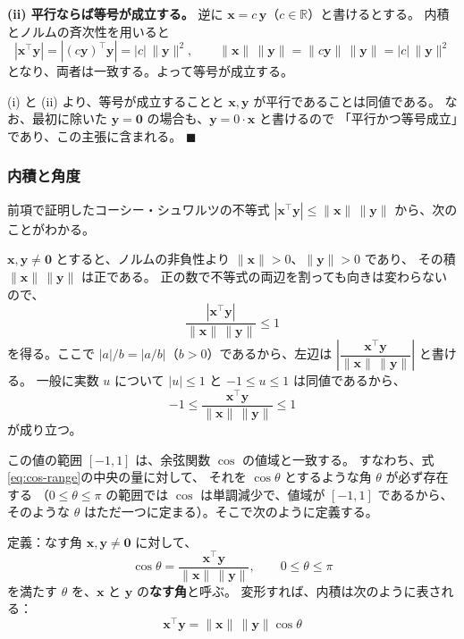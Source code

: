 \textbf{(ii) 平行ならば等号が成立する。}\quad
逆に $\bm{x} = c\,\bm{y}$（$c \in \mathbb{R}$）と書けるとする。
内積とノルムの斉次性を用いると
\begin{equation}
  |\bm{x}^\top \bm{y}| = |(c\bm{y})^\top \bm{y}| = |c| \, \|\bm{y}\|^2, \qquad
  \|\bm{x}\| \, \|\bm{y}\| = \|c\bm{y}\| \, \|\bm{y}\| = |c| \, \|\bm{y}\|^2
\end{equation}
となり、両者は一致する。よって等号が成立する。

(i) と (ii) より、等号が成立することと $\bm{x}, \bm{y}$ が平行であることは同値である。
なお、最初に除いた $\bm{y} = \bm{0}$ の場合も、$\bm{y} = 0 \cdot \bm{x}$ と書けるので
「平行かつ等号成立」であり、この主張に含まれる。
\hfill $\blacksquare$

\subsubsection{内積と角度}

前項で証明したコーシー・シュワルツの不等式
$|\bm{x}^\top \bm{y}| \leq \|\bm{x}\| \, \|\bm{y}\|$ から、次のことがわかる。

$\bm{x}, \bm{y} \neq \bm{0}$ とすると、ノルムの非負性より $\|\bm{x}\| > 0$、$\|\bm{y}\| > 0$ であり、
その積 $\|\bm{x}\| \, \|\bm{y}\|$ は正である。
正の数で不等式の両辺を割っても向きは変わらないので、
\begin{equation}
  \frac{|\bm{x}^\top \bm{y}|}{\|\bm{x}\| \, \|\bm{y}\|} \leq 1
\end{equation}
を得る。ここで $|a|/b = |a/b|$（$b > 0$）であるから、左辺は
$\left| \dfrac{\bm{x}^\top \bm{y}}{\|\bm{x}\| \, \|\bm{y}\|} \right|$ と書ける。
一般に実数 $u$ について $|u| \leq 1$ と $-1 \leq u \leq 1$ は同値であるから、
\begin{equation}
  -1 \leq \frac{\bm{x}^\top \bm{y}}{\|\bm{x}\| \, \|\bm{y}\|} \leq 1
  \label{eq:cos-range}
\end{equation}
が成り立つ。

この値の範囲 $[-1, 1]$ は、余弦関数 $\cos$ の値域と一致する。
すなわち、式\eqref{eq:cos-range}の中央の量に対して、
それを $\cos\theta$ とするような角 $\theta$ が必ず存在する
（$0 \leq \theta \leq \pi$ の範囲では $\cos$ は単調減少で、値域が $[-1,1]$ であるから、
そのような $\theta$ はただ一つに定まる）。そこで次のように定義する。

\begin{itembox}[l]{定義：なす角}
$\bm{x}, \bm{y} \neq \bm{0}$ に対して、
\begin{equation}
  \cos\theta = \frac{\bm{x}^\top \bm{y}}{\|\bm{x}\| \, \|\bm{y}\|},
  \qquad 0 \leq \theta \leq \pi
\end{equation}
を満たす $\theta$ を、$\bm{x}$ と $\bm{y}$ の\textbf{なす角}と呼ぶ。
変形すれば、内積は次のように表される：
\begin{equation}
  \bm{x}^\top \bm{y} = \|\bm{x}\| \, \|\bm{y}\| \cos\theta
\end{equation}
\end{itembox}

